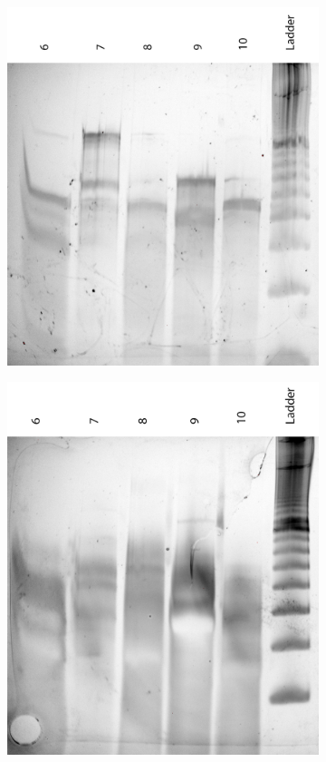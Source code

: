 \begin{figure}[h]
\begin{subfigure}[t]{0.51\textwidth}
  \includegraphics[width=\textwidth]{images/translator_transcription_long_1.png}
  \caption{}
  \label{translator_transcription_long_1}
\end{subfigure}
\begin{subfigure}[t]{0.49\textwidth}
  \includegraphics[width=\textwidth]{images/translator_transcription_long_2.png}

\end{subfigure}
\end{figure}
